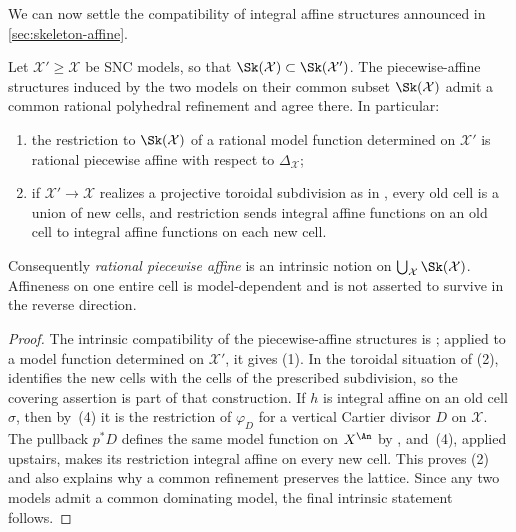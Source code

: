 We can now settle the compatibility of integral affine structures announced
in \cref{sec:skeleton-affine}.

\begin{proposition}
\label{prop:affine-structure-refinement}
Let $\mathcal X'\geq\mathcal X$ be SNC models, so that
$\Sk(\mathcal X)\subset\Sk(\mathcal X')$. The piecewise-affine structures
induced by the two models on their common subset $\Sk(\mathcal X)$ admit a
common rational polyhedral refinement and agree there.  In particular:
\begin{enumerate}
\item the restriction to $\Sk(\mathcal X)$ of a rational model function
  determined on $\mathcal X'$ is rational piecewise affine with respect to
  $\Delta_{\mathcal X}$;
\item if $\mathcal X'\to\mathcal X$ realizes a projective toroidal
  subdivision as in , every old cell is a
  union of new cells, and restriction sends integral affine functions on an
  old cell to integral affine functions on each new cell.
\end{enumerate}
Consequently \emph{rational piecewise affine} is an intrinsic notion on
$\bigcup_{\mathcal X}\Sk(\mathcal X)$.  Affineness on one entire cell is
model-dependent and is not asserted to survive in the reverse direction.
\end{proposition}

\begin{proof}
The intrinsic compatibility of the piecewise-affine structures is
\cite[Proposition~3.2.3 and Corollary~3.2.4]{MustataNicaise2015}; applied to
a model function determined on $\mathcal X'$, it gives (1).  In the
toroidal situation of (2),  identifies the
new cells with the cells of the prescribed subdivision, so the covering
assertion is part of that construction.  If $h$ is integral affine on an
old cell $\sigma$, then by
\,(4) it is the restriction of
$\varphi_D$ for a vertical Cartier divisor $D$ on $\mathcal X$.  The
pullback $p^*D$ defines the same model function on $X^{\An}$ by
, and
\,(4), applied upstairs, makes its
restriction integral affine on every new cell.  This proves (2) and also
explains why a common refinement preserves the lattice.  Since any two
models admit a common dominating model, the final intrinsic statement
follows.
\end{proof}

